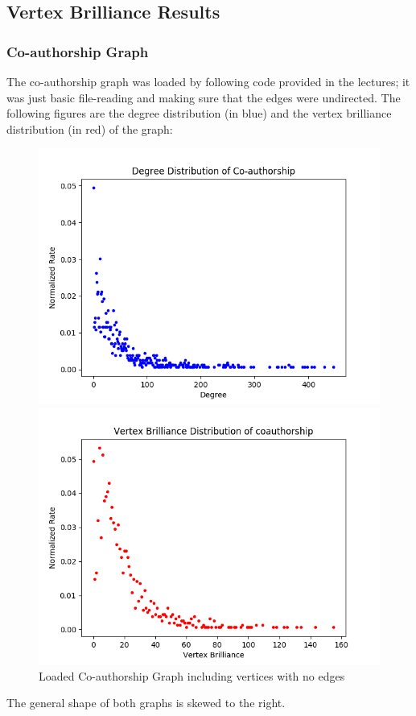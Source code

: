 \documentclass[11pt,a4paper,notitlepage]{article}
\begin{document}
\subsection*{Vertex Brilliance Results}
\subsubsection*{Co-authorship Graph}
The co-authorship graph was loaded by following code provided in the lectures; it was just basic file-reading and making sure that the edges were undirected. The following figures are the degree distribution (in blue) and the vertex brilliance distribution (in red) of the graph:
\begin{figure}[H]
    \centering
    \begin{minipage}{0.49\textwidth}
        \centering
        \includegraphics[width=1\textwidth]{coauthorship-vertex-degree.png}
    \end{minipage}
    \begin{minipage}{0.49\textwidth}
        \centering
        \includegraphics[width=1\textwidth]{coauthorship-vertex-brilliance.png}
    \end{minipage} \hfill
    \caption{Loaded Co-authorship Graph including vertices with no edges}
\end{figure}
The general shape of both graphs is skewed to the right.
\end{document}
